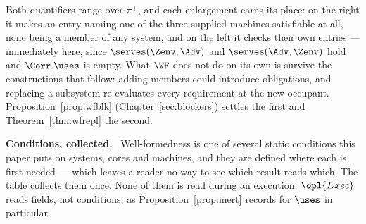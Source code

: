 \documentclass[10pt,oneside,openany]{book}
\newcommand{\heading}[1]{\medskip\par\noindent\textcolor{accent}{\textbf{#1.}}\ }
\theoremstyle{accentdef}
\theoremstyle{accentplain}
\begin{document}
Both quantifiers range over $\pi^{+}$, and each enlargement earns its place: on the right it
makes an entry naming one of the three supplied machines satisfiable at all, none being a member
of any system, and on the left it checks their own entries --- immediately here, since
$\serves(\Zenv,\Adv)$ and $\serves(\Adv,\Zenv)$ hold and $\Corr.\uses$ is empty. What $\WF$ does
not do on its own is survive the constructions that follow: adding members could introduce
obligations, and replacing a subsystem re-evaluates every requirement at the new occupant.
Proposition~\ref{prop:wfblk} (Chapter~\ref{sec:blockers}) settles the first and
Theorem~\ref{thm:wfrepl} the second.

\heading{Conditions, collected} Well-formedness is one of several static conditions this paper puts
on systems, cores and machines, and they are defined where each is first needed --- which leaves a
reader no way to see which result reads which. The table collects them once. None of them is read
during an execution: $\opl{Exec}$ reads fields, not conditions, as Proposition~\ref{prop:inert}
records for $\uses$ in particular.
\end{document}

